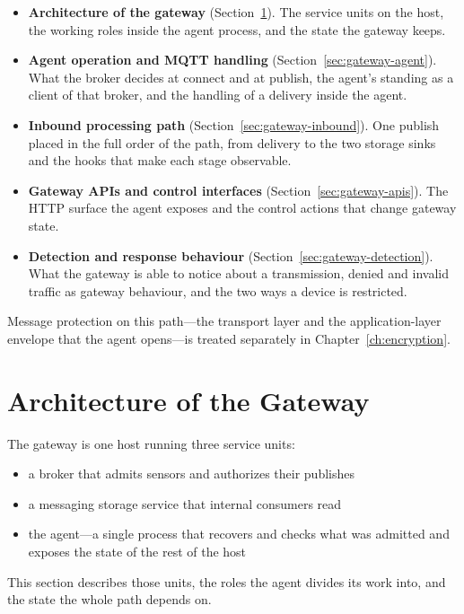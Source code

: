 \documentclass[12pt,a4paper]{report}
\begin{document}
\begin{itemize}
    \item \textbf{Architecture of the gateway}
    (Section~\ref{sec:gateway-architecture}).
    The service units on the host, the working roles inside the
    agent process, and the state the gateway keeps.
    \item \textbf{Agent operation and MQTT handling}
    (Section~\ref{sec:gateway-agent}).
    What the broker decides at connect and at publish, the agent's
    standing as a client of that broker, and the handling of a
    delivery inside the agent.
    \item \textbf{Inbound processing path}
    (Section~\ref{sec:gateway-inbound}).
    One publish placed in the full order of the path, from delivery
    to the two storage sinks and the hooks that make each stage
    observable.
    \item \textbf{Gateway APIs and control interfaces}
    (Section~\ref{sec:gateway-apis}).
    The HTTP surface the agent exposes and the control actions that
    change gateway state.
    \item \textbf{Detection and response behaviour}
    (Section~\ref{sec:gateway-detection}).
    What the gateway is able to notice about a transmission, denied and
    invalid traffic as gateway behaviour, and the two ways a device is
    restricted.
\end{itemize}

Message protection on this path---the transport layer and the
application-layer envelope that the agent opens---is treated
separately in Chapter~\ref{ch:encryption}.

\section{Architecture of the Gateway}
\label{sec:gateway-architecture}

The gateway is one host running three service units: 
\begin{itemize}
    \item a broker that admits sensors and authorizes their publishes
    \item a messaging storage service that internal consumers read
    \item the agent---a single process that recovers and checks what was admitted and exposes the state of the rest of the host
\end{itemize}
This section describes those units,
the roles the agent divides its work into, and the state the whole
path depends on.
\end{document}
